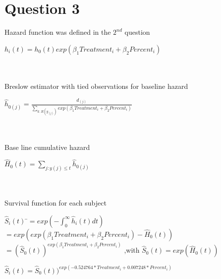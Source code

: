 \documentclass[a4paper, 12pt]{article}
\begin{document}
\section*{Question 3}
Hazard function was defined in the $2^{nd}$ question\\
\centerline{$h_i(t) = h_0(t)exp(\beta_1 Treatment_i+\beta_2 Percent_i)$} \\
\\
Breslow estimator with tied observations for baseline hazard\\
\centerline{$\hat{h}_{0(j)} = \frac{d_{(j)}}{\displaystyle \sum_{k:R(y_{(j)})}exp(\beta_1 Treatment_i+\beta_2 Percent_i)}$}\\
\\
Base line cumulative hazard\\
\centerline{$\hat{H}_0(t)=\displaystyle \sum_{j:y(j)\leq t}\hat{h}_{0(j)}$}\\
\\
Survival function for each subject
\begin{tabbing}
\hspace*{3cm} $\hat{S}_i(t)$ \=$=exp(\displaystyle -\int_{0}^{\infty}\hat{h}_i(t)dt)$\\
\>$=exp(exp(\beta_1 Treatment_i+\beta_2 Percent_i)-\hat{H}_0(t))$\\
\>$=(\hat{S}_0(t))^{exp(\beta_1 Treatment_i+\beta_2 Percent_i)}$ ,with  $\hat{S}_0(t)=exp(\hat{H}_0(t))$\\

\centerline{$\hat{S}_i(t)=\hat{S}_0(t))^{exp(-0.524764*Treatment_i+0.007248* Percent_i)}$}
\end{tabbing}
\end{document}
